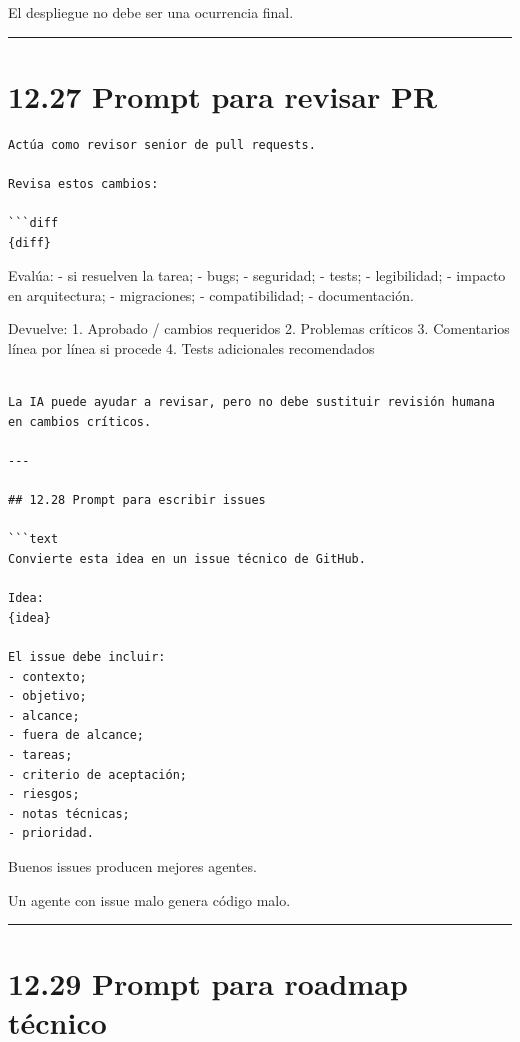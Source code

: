 El despliegue no debe ser una ocurrencia final.

\begin{center}\rule{0.5\linewidth}{0.5pt}\end{center}

\section{12.27 Prompt para revisar PR}\label{prompt-para-revisar-pr}

\begin{lstlisting}
Actúa como revisor senior de pull requests.

Revisa estos cambios:

```diff
{diff}
\end{lstlisting}

Evalúa: - si resuelven la tarea; - bugs; - seguridad; - tests; -
legibilidad; - impacto en arquitectura; - migraciones; - compatibilidad;
- documentación.

Devuelve: 1. Aprobado / cambios requeridos 2. Problemas críticos 3.
Comentarios línea por línea si procede 4. Tests adicionales recomendados

\begin{lstlisting}

La IA puede ayudar a revisar, pero no debe sustituir revisión humana en cambios críticos.

---

## 12.28 Prompt para escribir issues

```text
Convierte esta idea en un issue técnico de GitHub.

Idea:
{idea}

El issue debe incluir:
- contexto;
- objetivo;
- alcance;
- fuera de alcance;
- tareas;
- criterio de aceptación;
- riesgos;
- notas técnicas;
- prioridad.
\end{lstlisting}

Buenos issues producen mejores agentes.

Un agente con issue malo genera código malo.

\begin{center}\rule{0.5\linewidth}{0.5pt}\end{center}

\section{12.29 Prompt para roadmap
técnico}\label{prompt-para-roadmap-tuxe9cnico}

